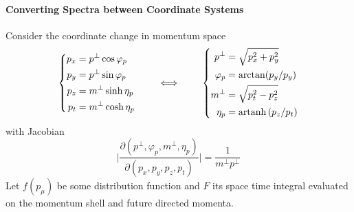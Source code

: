 \paragraph{Converting Spectra between Coordinate Systems}

Consider the coordinate change in momentum space
\begin{equation}
    \left\{
    \begin{split}
        p_x&=p^\perp\cos\varphi_p\\
        p_y&=p^\perp\sin\varphi_p\\
        p_z&=m^\perp\sinh\eta_p\\
        p_t&=m^\perp\cosh\eta_p
    \end{split}
    \right.\qquad\iff\qquad
    \left\{
    \begin{split}
        p^\perp&=\sqrt{p_x^2+p_y^2}\\
        \varphi_p&=\arctan(p_y/p_y)\\
        m^\perp&=\sqrt{p_t^2-p_z^2}\\
        \eta_p&={\text{artanh}\,}(p_z/p_t)
    \end{split}
    \right.
\end{equation}
with Jacobian
\begin{equation}
    \big\vert\frac{\partial(p^\perp,\varphi_p,m^\perp,\eta_p)}{\partial(p_x,p_y,p_z,p_t)}\big\vert=\frac{1}{m^\perp p^\perp}
\end{equation}
Let $f(p_\mu)$ be some distribution function and $F$ its space time integral evaluated on the momentum shell and future directed momenta.

